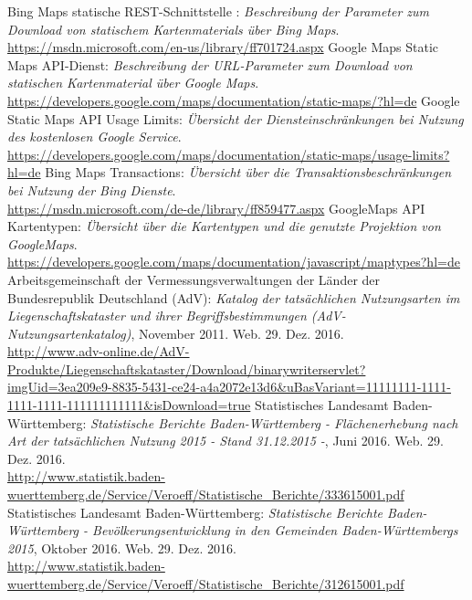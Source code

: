 \begin{thebibliography}{50}
   Bing Maps statische REST-Schnittstelle : \textit{Beschreibung der Parameter zum Download von statischem Kartenmaterials über Bing Maps}.\\ \url{https://msdn.microsoft.com/en-us/library/ff701724.aspx}
   Google Maps Static Maps API-Dienst: \textit{Beschreibung der URL-Parameter zum Download von statischen Kartenmaterial über Google Maps}.\\ \url{https://developers.google.com/maps/documentation/static-maps/?hl=de}
   Google Static Maps API Usage Limits: \textit{Übersicht der Diensteinschränkungen bei Nutzung des kostenlosen Google Service}.\\ \url{https://developers.google.com/maps/documentation/static-maps/usage-limits?hl=de}
   Bing Maps Transactions: \textit{Übersicht über die Transaktionsbeschränkungen bei Nutzung der Bing Dienste}.\\ \url{https://msdn.microsoft.com/de-de/library/ff859477.aspx}
   GoogleMaps API Kartentypen: \textit{Übersicht über die Kartentypen und die genutzte Projektion von GoogleMaps}.\\ \url{https://developers.google.com/maps/documentation/javascript/maptypes?hl=de}
   Arbeitsgemeinschaft der Vermessungsverwaltungen der Länder der Bundesrepublik Deutschland (AdV): \textit{Katalog der tatsächlichen Nutzungsarten im Liegenschaftskataster und ihrer Begriffsbestimmungen (AdV-Nutzungsartenkatalog)}, November 2011. Web. 29. Dez. 2016.\\ \url{http://www.adv-online.de/AdV-Produkte/Liegenschaftskataster/Download/binarywriterservlet?imgUid=3ea209e9-8835-5431-ce24-a4a2072e13d6&uBasVariant=11111111-1111-1111-1111-111111111111&isDownload=true}
   Statistisches Landesamt Baden-Württemberg: \textit{Statistische Berichte Baden-Württemberg - Flächenerhebung nach Art der tatsächlichen Nutzung 2015 - Stand 31.12.2015 -}, Juni 2016. Web. 29. Dez. 2016. \\ \url{http://www.statistik.baden-wuerttemberg.de/Service/Veroeff/Statistische_Berichte/333615001.pdf} 
   Statistisches Landesamt Baden-Württemberg: \textit{Statistische Berichte Baden-Württemberg - Bevölkerungsentwicklung in den Gemeinden Baden-Württembergs 2015}, Oktober 2016. Web. 29. Dez. 2016. \\ \url{http://www.statistik.baden-wuerttemberg.de/Service/Veroeff/Statistische_Berichte/312615001.pdf} 
\end{thebibliography}
